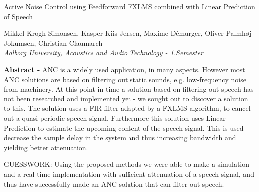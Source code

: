 
\begin{center}
\begin{huge}
Active Noise Control using Feedforward FXLMS combined with Linear Prediction of Speech
\end{huge}

\vspace{5mm}
Mikkel Krogh Simonsen, Kasper Kiis Jensen, Maxime Démurger, Oliver Palmhøj Jokumsen, Christian Claumarch
\\
\textit{Aalborg University, Acoustics and Audio Technology - 1.Semester}


\vspace{5mm}

\textbf{Abstract -} ANC is a widely used application, in many aspects. However most ANC solutions are based on filtering out static sounds, e.g. low-frequency noise from machinery. At this point in time a solution based on filtering out speech has not been researched and implemented yet - we sought out to discover a solution to this.
The solution uses a FIR-filter adapted by a FXLMS-algorithm, to cancel out a quasi-periodic speech signal. Furthermore this solution uses Linear Prediction to estimate the upcoming content of the speech signal. This is used decrease the sample delay in the system and thus increasing bandwidth and yielding better attenuation.




GUESSWORK: Using the proposed methods we were able to make a simulation and a real-time implementation with sufficient attenuation of a speech signal, and thus have successfully made an ANC solution that can filter out speech.  












\end{center}